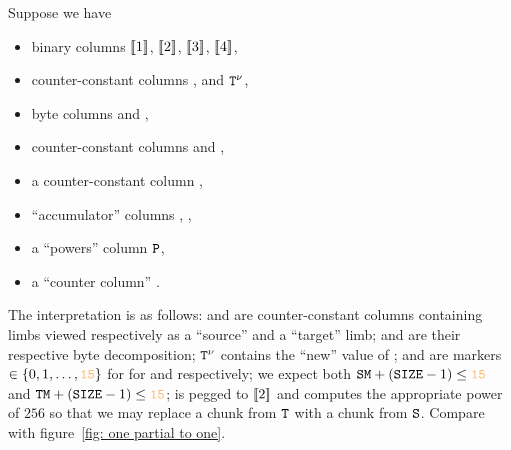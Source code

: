 Suppose we have
\begin{itemize}
	\item binary columns $[\![1]\!]$, $[\![2]\!]$, $[\![3]\!]$, $[\![4]\!]$,
	\item counter-constant columns \source{}, \target{} and $\texttt{T}{}^{\nu}$,
	\item byte columns \source{}\byte{} and \target{}\byte{},
	\item counter-constant columns \source{}\mark{} and \target{}\mark{},
	\item a counter-constant column \size{},
	\item ``accumulator'' columns , ,
	\item a ``powers'' column $\texttt{P}$,
	\item a ``counter column'' \ct{}.
\end{itemize}
The interpretation is as follows: 
\source{} and \target{} are counter-constant columns containing limbs viewed respectively as a ``source'' and a ``target'' limb;
\source{}\byte{} and \target{}\byte{} are their respective byte decomposition;
$\texttt{T}{}^{\nu}$ contains the ``new'' value of \target{};
\source{}\mark{} and \target{}\mark{} are markers $\in\{0,1,\dots,\llargeMO\}$ for for \source{} and \target{} respectively;
we expect both
$\col{SM} + (\size{}-1)\leq \llargeMO$ and
$\col{TM} + (\size{}-1)\leq \llargeMO$;
 is pegged to $[\![2]\!]$ and computes the appropriate power of $256$ so that we may replace a chunk from $\texttt{T}$ with a chunk from $\texttt{S}{}$.
Compare with figure~\ref{fig: one partial to one}.


